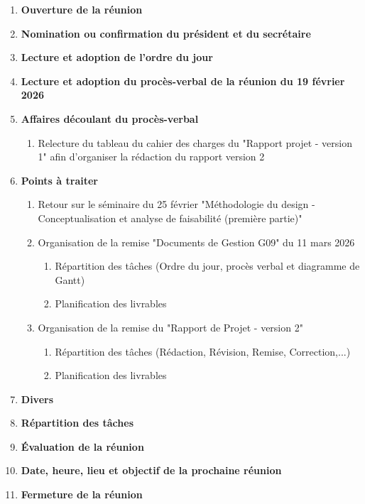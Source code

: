 \documentclass[12pt]{ULojpv}
\begin{document}
\entete
\begin{enumerate}
   \item \textbf{Ouverture de la réunion}
   \item \textbf{Nomination ou confirmation du président et du secrétaire}
   \item \textbf{Lecture et adoption de l'ordre du jour}
   \item \textbf{Lecture et adoption du procès-verbal de la réunion du 19 février 2026}
   \item \textbf{Affaires découlant du procès-verbal}
      \begin{enumerate}
         \item Relecture du tableau du cahier des charges du "Rapport projet - version 1" afin d'organiser la rédaction du rapport version 2
      \end{enumerate}
   \item \textbf{Points à traiter}
      \begin{enumerate}
         \item Retour sur le séminaire du 25 février "Méthodologie du design - Conceptualisation et analyse de faisabilité  (première partie)"
         \item Organisation de la remise "Documents de Gestion G09" du 11 mars 2026
          \begin{enumerate}
               \item Répartition des tâches (Ordre du jour, procès verbal et diagramme de Gantt)
               \item Planification des livrables
            \end{enumerate}
        \item Organisation de la remise du "Rapport de Projet - version 2"  
        \begin{enumerate}
               \item Répartition des tâches (Rédaction, Révision, Remise, Correction,...)
               \item Planification des livrables
            \end{enumerate}
        
      \end{enumerate}
   \item \textbf{Divers}
   \item \textbf{Répartition des tâches}
   \item \textbf{Évaluation de la réunion}
   \item \textbf{Date, heure, lieu et objectif de la prochaine réunion}
   \item \textbf{Fermeture de la réunion}
\end{enumerate}
\end{document}
